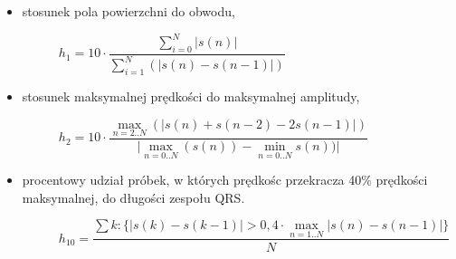 \begin{itemize}
\item stosunek pola powierzchni do obwodu,\newline
\begin{figure}[h]
\centering
$h_{1} = 10 \cdot\dfrac{\sum\limits_{i=0}^N \lvert s(n)\lvert}
{\sum\limits_{i=1}^N (\lvert s(n)-s(n-1)\lvert )} $
\end{figure}
\item stosunek maksymalnej prędkości do maksymalnej amplitudy,\newline
\begin{figure}[h]
\centering
$h_{2} = 10 \cdot\dfrac{\max\limits_{n=2..N} (\lvert s(n)+s(n-2)-2s(n-1) \lvert )}
{\lvert \max\limits_{n=0..N} (s(n)) - \min\limits_{n=0..N} s(n)) \lvert} $
\end{figure}
\item procentowy udział próbek, w których prędkośc przekracza 40\% prędkości maksymalnej, do długości zespołu QRS. \newline
\begin{figure}[h]
\centering
$h_{10} = \dfrac{\sum k : \{\lvert s(k)-s(k-1)\lvert > 0,4 \cdot\max\limits_{n=1..N}\lvert s(n)-s(n-1)\lvert\}}
{N} $
\end{figure}
\end{itemize}

